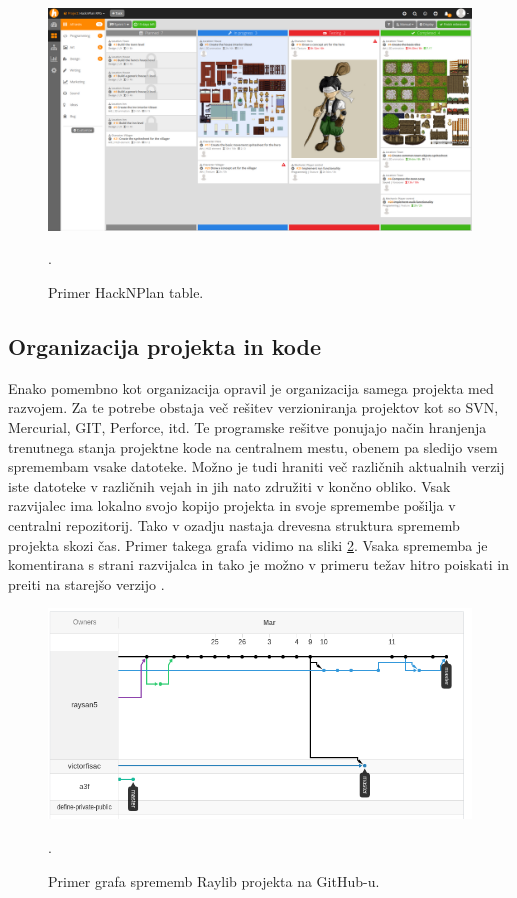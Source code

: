 \documentclass[12pt,a4paper,twoside]{book}
\begin{document}
\begin{figure}[h]
	\centering
	\includegraphics[width=13cm]{hacknplanDemo}
	\caption{Primer HackNPlan table.}.
	\label{slika:hacknplanDemo}
	\vspace*{-2em}
\end{figure}

\subsection{Organizacija projekta in kode}
Enako pomembno kot organizacija opravil je organizacija samega projekta med razvojem. Za te potrebe obstaja več rešitev verzioniranja projektov kot so SVN, Mercurial, GIT, Perforce, itd. Te programske rešitve ponujajo način hranjenja trenutnega stanja projektne kode na centralnem mestu, obenem pa sledijo vsem spremembam vsake datoteke. Možno je tudi hraniti več različnih aktualnih verzij iste datoteke v različnih vejah in jih nato združiti v končno obliko. Vsak razvijalec ima lokalno svojo kopijo projekta in svoje spremembe pošilja v centralni repozitorij. Tako v ozadju nastaja drevesna struktura sprememb projekta skozi čas. Primer takega grafa vidimo na sliki \ref{slika:gitGraph}. Vsaka sprememba je komentirana s strani razvijalca in tako je možno v primeru težav hitro poiskati in preiti na starejšo verzijo \cite{versionControl}.
	
\begin{figure}[h]
	\centering
	\includegraphics[width=13cm]{gitGraph}
	\caption{Primer grafa sprememb Raylib projekta na GitHub-u.}.
	\label{slika:gitGraph}
	\vspace*{-2em}
\end{figure}
\end{document}
